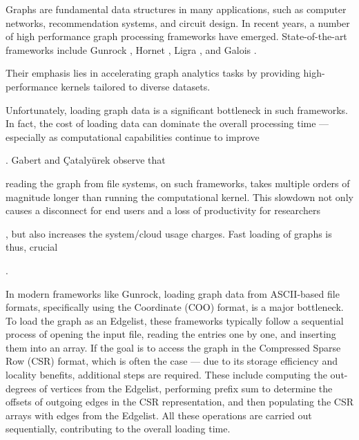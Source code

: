 Graphs are fundamental data structures in many applications, such as computer networks, recommendation systems, and circuit design. In recent years, a number of high performance graph processing frameworks have emerged. State-of-the-art frameworks include Gunrock \cite{wang2016gunrock}, Hornet \cite{busato2018hornet}, Ligra \cite{shun2013ligra}, and Galois \cite{nguyen2013lightweight}. Their emphasis lies in accelerating graph analytics tasks by providing high-performance kernels tailored to diverse datasets.

Unfortunately, loading graph data is a significant bottleneck in such frameworks. In fact, the cost of loading data can dominate the overall processing time --- especially as computational capabilities continue to improve. Gabert and Çatalyürek \cite{gabert2021pigo} observe that reading the graph from file systems, on such frameworks, takes multiple orders of magnitude longer than running the computational kernel. This slowdown not only causes a disconnect for end users and a loss of productivity for researchers, but also increases the system/cloud usage charges. Fast loading of graphs is thus, crucial.

In modern frameworks like Gunrock, loading graph data from ASCII-based file formats, specifically using the Coordinate (COO) format, is a major bottleneck. To load the graph as an Edgelist, these frameworks typically follow a sequential process of opening the input file, reading the entries one by one, and inserting them into an array. If the goal is to access the graph in the Compressed Sparse Row (CSR) format, which is often the case --- due to its storage efficiency and locality benefits, additional steps are required. These include computing the out-degrees of vertices from the Edgelist, performing prefix sum to determine the offsets of outgoing edges in the CSR representation, and then populating the CSR arrays with edges from the Edgelist. All these operations are carried out sequentially, contributing to the overall loading time.

